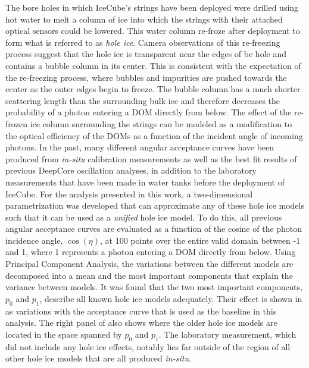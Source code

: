 The bore holes in which IceCube's strings have been deployed were drilled using hot water to melt a column of ice into which the strings with their attached optical sensors could be lowered. This water column re-froze after deployment to form what is referred to as \emph{hole ice}. Camera observations of this re-freezing process suggest that the hole ice is transparent near the edges of be hole and contains a bubble column in its center. This is consistent with the expectation of the re-freezing process, where bubbles and impurities are pushed towards the center as the outer edges begin to freeze. The bubble column has a much shorter scattering length than the surrounding bulk ice and therefore decreases the probability of a photon entering a DOM directly from below.
The effect of the re-frozen ice column surrounding the strings can be modeled as a modification to the optical efficiency of the DOMs as a function of the incident angle of incoming photons. In the past, many different angular acceptance curves have been produced from \emph{in-situ} calibration measurements as well as the best fit results of previous DeepCore oscillation analyses, in addition to the laboratory measurements that have been made in water tanks before the deployment of IceCube. For the analysis presented in this work, a two-dimensional parametrization was developed that can approximate any of these hole ice models such that it can be used as a \emph{unified} hole ice model. To do this, all previous angular acceptance curves are evaluated as a function of the cosine of the photon incidence angle, $\cos(\eta)$, at 100 points over the entire valid domain between -1 and 1, where 1 represents a photon entering a DOM directly from below. Using Principal Component Analysis, the variations between the different models are decomposed into a mean and the most important components that explain the variance between models. It was found that the two most important components, $p_0$ and $p_1$, describe all known hole ice models adequately. Their effect is shown in  as variations with the acceptance curve that is used as the baseline in this analysis. The right panel of  also shows where the older hole ice models are located in the space spanned by $p_0$ and $p_1$. The laboratory measurement, which did not include any hole ice effects, notably lies far outside of the region of all other hole ice models that are all produced \emph{in-situ}.

